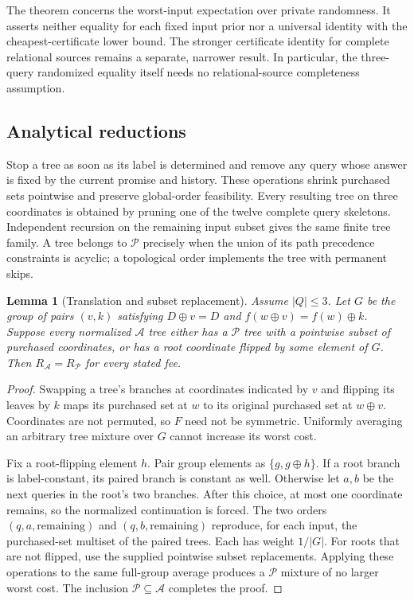 \documentclass[pdflatex,sn-mathphys-num]{sn-jnl}
\theoremstyle{thmstyleone}
\newtheorem{lemma}[theorem]{Lemma}
\theoremstyle{thmstylethree}
\theoremstyle{thmstyletwo}
\begin{document}
The theorem concerns the worst-input expectation over private randomness.
It asserts neither equality for each fixed input prior nor a universal
identity with the cheapest-certificate lower bound.
The stronger certificate identity for complete relational sources remains
a separate, narrower result. In particular, the three-query randomized
equality itself needs no relational-source completeness assumption.

\subsection{Analytical reductions}
Stop a tree as soon as its label is determined and remove any query whose
answer is fixed by the current promise and history. These operations shrink
purchased sets pointwise and preserve global-order feasibility. Every
resulting tree on three coordinates is obtained by pruning one of the
twelve complete query skeletons. Independent recursion on the remaining
input subset gives the same finite tree family. A tree belongs to
$\mathcal P$ precisely when the union of its path precedence constraints
is acyclic; a topological order implements the tree with permanent skips.

\begin{lemma}[Translation and subset replacement]
\label{lem:generic-root-flip}
Assume $|Q|\leq3$. Let $G$ be the group of pairs $(v,k)$ satisfying
$D\mathbin{\oplus}v=D$ and
$f(w\mathbin{\oplus}v)=f(w)\mathbin{\oplus}k$.
Suppose every normalized $\mathcal A$ tree either has a $\mathcal P$ tree
with a pointwise subset of purchased coordinates, or has a root coordinate
flipped by some element of $G$. Then $R_{\mathcal A}=R_{\mathcal P}$
for every stated fee.
\end{lemma}
\begin{proof}
Swapping a tree's branches at coordinates indicated by $v$ and flipping
its leaves by $k$ maps its purchased set at $w$ to its original purchased
set at $w\mathbin{\oplus}v$. Coordinates are not permuted, so $F$ need not
be symmetric. Uniformly averaging an arbitrary tree mixture over $G$
cannot increase its worst cost.

Fix a root-flipping element $h$. Pair group elements as $\{g,g\oplus h\}$.
If a root branch is label-constant, its paired branch is constant as well.
Otherwise let $a,b$ be the next queries in the root's two branches.
After this choice, at most one coordinate remains, so the normalized
continuation is forced. The two orders $(q,a,\text{remaining})$ and
$(q,b,\text{remaining})$ reproduce, for each input, the purchased-set
multiset of the paired trees. Each has weight $1/|G|$.
For roots that are not flipped, use the supplied pointwise subset
replacements. Applying these operations to the same full-group average
produces a $\mathcal P$ mixture of no larger worst cost.
The inclusion $\mathcal P\subseteq\mathcal A$ completes the proof.
\end{proof}
\end{document}
